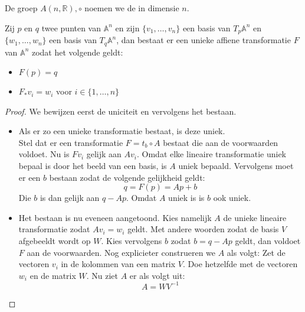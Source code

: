 \documentclass[main.tex]{subfiles}
\begin{document}
\begin{de}
  De groep $A(n,\mathbb{R}),\circ$ noemen we de  in dimensie $n$.
\end{de}

\begin{st}
  \label{st:rakende-ruimtes-transformatie}
  Zij $p$ en $q$ twee punten van $\mathbb{A}^{n}$ en zijn $\{v_{1},\dotsc,v_{n}\}$ een basis van $T_{p}\mathbb{A}^{n}$ en $\{w_{1},\dotsc,w_{n}\}$ een basis van $T_{q}\mathbb{A}^{n}$, dan bestaat er een unieke affiene transformatie $F$ van $\mathbb{A}^{n}$ zodat het volgende geldt:
  \begin{itemize}
  \item $F(p) = q$
  \item $F_{*}v_{i} = w_{i}$ voor $i \in \{ 1,\dotsc,n \}$
  \end{itemize}

  \begin{proof}
    We bewijzen eerst de uniciteit en vervolgens het bestaan.
    \begin{itemize}
    \item Als er zo een unieke transformatie bestaat, is deze uniek.\\
      Stel dat er een transformatie $F = t_{b} \circ A$ bestaat die aan de voorwaarden voldoet.
      Nu is $Fv_{i}$ gelijk aan $Av_{i}$.
      Omdat elke lineaire transformatie uniek bepaal is door het beeld van een basis, is $A$ uniek bepaald.
      Vervolgens moet er een $b$ bestaan zodat de volgende gelijkheid geldt:
      \[ q = F(p) = Ap + b \]
      Die $b$ is dan gelijk aan $q-Ap$.
      Omdat $A$ uniek is is $b$ ook uniek.
    \item
      Het bestaan is nu eveneen aangetoond. 
      Kies namelijk $A$ de unieke lineaire transformatie zodat $Av_{i} = w_{i}$ geldt.
      Met andere woorden zodat de basis $V$ afgebeeldt wordt op $W$.
      Kies vervolgens $b$ zodat $b=q-Ap$ geldt, dan voldoet $F$ aan de voorwaarden.
      Nog explicieter construeren we $A$ als volgt:
      Zet de vectoren $v_{i}$ in de kolommen van een matrix $V$.
      Doe hetzelfde met de vectoren $w_{i}$ en de matrix $W$.
      Nu ziet $A$ er als volgt uit:
      \[ A = WV^{-1} \]
    \end{itemize}
  \end{proof}
\end{st}
\end{document}
